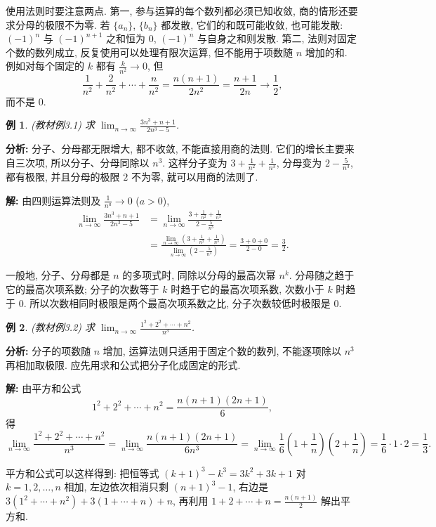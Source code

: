 \documentclass[UTF8,openany]{ctexbook}
\theoremstyle{chinesetextbook}
\newtheorem{example}{例}[section]
\newenvironment{cnsolution}{\par\indent\textbf{解:} \ignorespaces}{\par}
\begin{document}
使用法则时要注意两点. 第一, 参与运算的每个数列都必须已知收敛, 商的情形还要求分母的极限不为零. 若 $\{a_n\}$, $\{b_n\}$ 都发散, 它们的和既可能收敛, 也可能发散: $(-1)^n$ 与 $(-1)^{n+1}$ 之和恒为 $0$, $(-1)^n$ 与自身之和则发散. 第二, 法则对固定个数的数列成立, 反复使用可以处理有限次运算, 但不能用于项数随 $n$ 增加的和. 例如对每个固定的 $k$ 都有 $\displaystyle\frac k{n^2}\to0$, 但
\[
\frac1{n^2}+\frac2{n^2}+\cdots+\frac n{n^2}=\frac{n(n+1)}{2n^2}=\frac{n+1}{2n}\to\frac12,
\]
而不是 $0$.
\begin{example}
\textnormal{(教材例3.1)} 求 $\displaystyle\lim_{n\to\infty}\frac{3n^3+n+1}{2n^3-5}$.
\end{example}
\par\indent\textbf{分析:} 分子、分母都无限增大, 都不收敛, 不能直接用商的法则. 它们的增长主要来自三次项, 所以分子、分母同除以 $n^3$. 这样分子变为 $\displaystyle3+\frac1{n^2}+\frac1{n^3}$, 分母变为 $\displaystyle2-\frac5{n^3}$, 都有极限, 并且分母的极限 $2$ 不为零, 就可以用商的法则了.
\begin{cnsolution}
由四则运算法则及 $\displaystyle\frac1{n^a}\to0$ ($a>0$),
\[
\begin{aligned}
\lim_{n\to\infty}\frac{3n^3+n+1}{2n^3-5}
&=\lim_{n\to\infty}\frac{3+\frac1{n^2}+\frac1{n^3}}{2-\frac5{n^3}}\\
&=\frac{\displaystyle\lim_{n\to\infty}\left(3+\frac1{n^2}+\frac1{n^3}\right)}{\displaystyle\lim_{n\to\infty}\left(2-\frac5{n^3}\right)}
=\frac{3+0+0}{2-0}=\frac32.
\end{aligned}
\]
\end{cnsolution}
一般地, 分子、分母都是 $n$ 的多项式时, 同除以分母的最高次幂 $n^k$. 分母随之趋于它的最高次项系数; 分子的次数等于 $k$ 时趋于它的最高次项系数, 次数小于 $k$ 时趋于 $0$. 所以次数相同时极限是两个最高次项系数之比, 分子次数较低时极限是 $0$.
\begin{example}
\textnormal{(教材例3.2)} 求 $\displaystyle\lim_{n\to\infty}\frac{1^2+2^2+\cdots+n^2}{n^3}$.
\end{example}
\par\indent\textbf{分析:} 分子的项数随 $n$ 增加, 运算法则只适用于固定个数的数列, 不能逐项除以 $n^3$ 再相加取极限. 应先用求和公式把分子化成固定的形式.
\begin{cnsolution}
由平方和公式
\[
1^2+2^2+\cdots+n^2=\frac{n(n+1)(2n+1)}6,
\]
得
\[
\lim_{n\to\infty}\frac{1^2+2^2+\cdots+n^2}{n^3}
=\lim_{n\to\infty}\frac{n(n+1)(2n+1)}{6n^3}
=\lim_{n\to\infty}\frac16\left(1+\frac1n\right)\left(2+\frac1n\right)
=\frac16\cdot1\cdot2=\frac13.
\]
\end{cnsolution}
平方和公式可以这样得到: 把恒等式 $(k+1)^3-k^3=3k^2+3k+1$ 对 $k=1,2,\ldots,n$ 相加, 左边依次相消只剩 $(n+1)^3-1$, 右边是 $3(1^2+\cdots+n^2)+3(1+\cdots+n)+n$, 再利用 $\displaystyle1+2+\cdots+n=\frac{n(n+1)}2$ 解出平方和.
\end{document}
